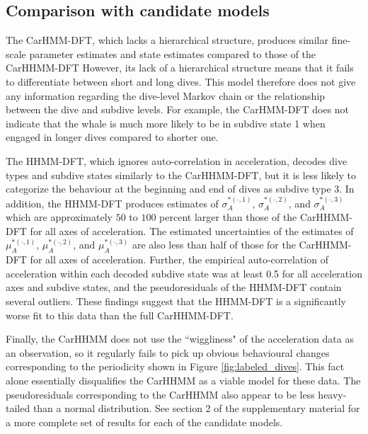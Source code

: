 \subsection{Comparison with candidate models}

The CarHMM-DFT, which lacks a hierarchical structure, produces similar fine-scale parameter estimates and state estimates compared to those of the CarHHMM-DFT However, its lack of a hierarchical structure means that it fails to differentiate between short and long dives. This model therefore does not give any information regarding the dive-level Markov chain or the relationship between the dive and subdive levels. For example, the CarHMM-DFT does not indicate that the whale is much more likely to be in subdive state 1 when engaged in longer dives compared to shorter one.

The HHMM-DFT, which ignores auto-correlation in acceleration, decodes dive types and subdive states similarly to the CarHHMM-DFT, but it is less likely to categorize the behaviour at the beginning and end of dives as subdive type 3. In addition, the HHMM-DFT produces estimates of $\sigma_A^{*(\cdot,1)}$, $\sigma_A^{*(\cdot,2)}$, and $\sigma_A^{*(\cdot,3)}$ which are approximately $50$ to $100$ percent larger than those of the CarHHMM-DFT for all axes of acceleration. The estimated uncertainties of the estimates of $\mu_A^{*(\cdot,1)}$, $\mu_A^{*(\cdot,2)}$, and $\mu_A^{*(\cdot,3)}$ are also less than half of those for the CarHHMM-DFT for all axes of acceleration. Further, the empirical auto-correlation of acceleration within each decoded subdive state was at least 0.5 for all acceleration axes and subdive states, and the pseudoresiduals of the HHMM-DFT contain several outliers. These findings suggest that the HHMM-DFT is a significantly worse fit to this data than the full CarHHMM-DFT.

Finally, the CarHHMM does not use the ``wiggliness" of the acceleration data as an observation, so it regularly fails to pick up obvious behavioural changes corresponding to the periodicity shown in Figure \ref{fig:labeled_dives}. This fact alone essentially disqualifies the CarHHMM as a viable model for these data. The pseudoresiduals corresponding to the CarHHMM also appear to be less heavy-tailed than a normal distribution. See section 2 of the supplementary material for a more complete set of results for each of the candidate models.